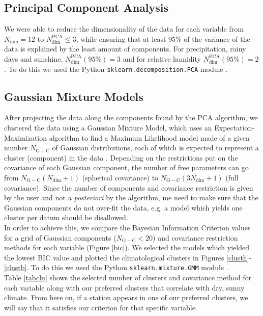 \documentclass[12pt]{iopart}
\begin{document}
\subsection{Principal Component Analysis}

We were able to reduce the dimensionality of the data for each variable from  $N_\mathrm{dim}=12$ to  $N_\mathrm{dim}^\mathrm{PCA}\le3$, while ensuring that at least 95\% of the variance of the data is explained by the least amount of components. For precipitation, rainy days and sunshine, $N_\mathrm{dim}^\mathrm{PCA}(95\%)=3$ and for relative humidity $N_\mathrm{dim}^\mathrm{PCA}(95\%)=2$. To do this we used the Python \texttt{sklearn.decomposition.PCA} module \cite{sklearn}.

\subsection{Gaussian Mixture Models}

After projecting the data along the components found by the PCA algorithm, we clustered the data using a Gaussian Mixture Model, which uses an Expectation-Maximization algorithm to find a Maximum Likelihood model made of a given number $N_\mathrm{G-C}$ of Gaussian distributions, each of which is expected to represent a cluster (component) in the data \cite{gmm}. Depending on the restrictions put on the covariance of each Gaussian component, the number of free parameters can go from $N_\mathrm{G-C}(N_\mathrm{dim}+1)$ (spherical covariance) to  $N_\mathrm{G-C}(3N_\mathrm{dim}+1)$ (full covariance). Since the number of components and covariance restriction is given by the user and not \emph{a posteriori} by the algorithm, me need to make sure that the Gaussian components do not over-fit the data, e.g. a model which yields one cluster per datum should be disallowed.\\

In order to achieve this, we compare the Bayesian Information Criterion values \cite{bicref} for a grid of Gaussian components ($N_\mathrm{G-C}<20$) and covariance restriction methods for each variable (Figure \ref{bic}). We selected the models which yielded the lowest BIC value and plotted the climatological clusters in Figures \ref{clusth}-\ref{clustb}. To do this we used the Python \texttt{sklearn.mixture.GMM} module \cite{sklearn}.\\

Table \ref{tabclu} shows the selected number of clusters and covariance method for each variable along with our preferred clusters that correlate with dry, sunny climate. From here on, if a station appears in one of our preferred clusters, we will say that it satisfies our criterion for that specific variable.
\end{document}
